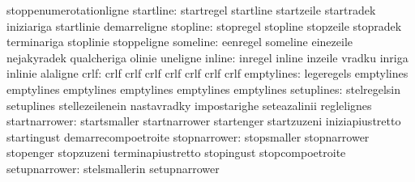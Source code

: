                                   stoppenumerotationligne
                       startline: startregel                       startline
                                  startzeile                       startradek
                                  iniziariga                       startlinie
                                  demarreligne
                        stopline: stopregel                        stopline
                                  stopzeile                        stopradek
                                  terminariga                      stoplinie
                                  stoppeligne
                        someline: eenregel                         someline
                                  einezeile                        nejakyradek
                                  qualcheriga                      olinie
                                  uneligne
                          inline: inregel                          inline
                                  inzeile                          vradku
                                  inriga                           inlinie
                                  alaligne
                            crlf: crlf                             crlf
                                  crlf                             crlf
                                  crlf                             crlf
                                  crlf
                      emptylines: legeregels                       emptylines
                                  emptylines                       emptylines
                                  emptylines                       emptylines
                                  emptylines
                      setuplines: stelregelsin                     setuplines
                                  stellezeilenein                  nastavradky
                                  impostarighe                     seteazalinii
                                  reglelignes
                   startnarrower: startsmaller                     startnarrower
                                  startenger                       startzuzeni
                                  iniziapiustretto                 startingust
                                  demarrecompoetroite
                    stopnarrower: stopsmaller                      stopnarrower
                                  stopenger                        stopzuzeni
                                  terminapiustretto                stopingust
                                  stopcompoetroite
                   setupnarrower: stelsmallerin                    setupnarrower
